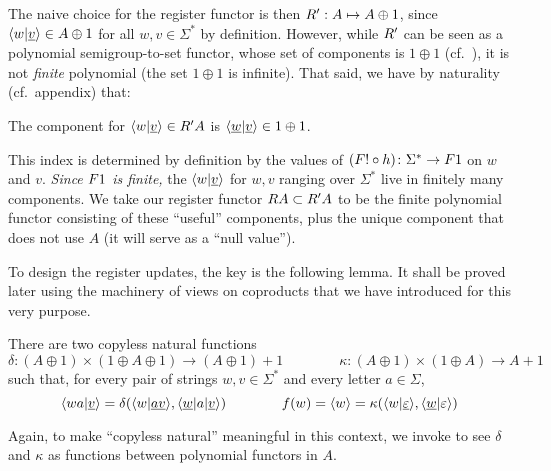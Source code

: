 The naive choice for the register functor is then $\functorr' : A \mapsto A
\oplus 1$, since $\langle w|\underline{v} \rangle \in A\oplus1$ for all $w,v\in\Sigma^*$
by definition. However, while $\functorr'$ can be seen as a polynomial
semigroup-to-set functor, whose set of components is $1 \oplus 1$ (cf.~), it is not \emph{finite} polynomial (the set $1\oplus1$ is infinite). That said, we have by naturality (cf.~appendix) that:
\begin{claim}\label{clm:component-index}
  The component for $\tuple{w|\underline{v}} \in \functorr'A$ is $\langle \underline{w}|\underline{v} \rangle \in 1 \oplus 1$.
\end{claim}
This index is determined by definition by the values of $(\functor! \circ h) \colon \Sigma^* \to \functor1$ on $w$ and $v$. \emph{Since $\functor1$ is finite,} the $\langle w|\underline{v} \rangle$ for $w,v$ ranging over $\Sigma^*$ live in finitely many components. We take our register functor  $\functorr A \subset \functorr' A$ to be the finite polynomial functor consisting of these \enquote{useful} components, plus the unique component that does not use $A$ (it will serve as a \enquote{null value}).

To design the register updates, the key is the following lemma. It shall be proved later using the machinery of views on coproducts that we have introduced for this very purpose.
\begin{lemma}\label{lem:compute-next-configuration}
  There are two {copyless} natural functions
  \[
    \delta\colon (A \oplus 1) \times (1 \oplus A \oplus 1) \to (A \oplus 1) + 1
    \qquad\qquad
    \kappa\colon (A \oplus 1) \times (1 \oplus A) \to A + 1
  \]
  such that, for every pair of strings $w,v \in \Sigma^*$ and every letter $a
  \in \Sigma$,
  \[ \langle wa|\underline v \rangle = \delta(\langle w|\underline
      {av} \rangle,\langle \underline w | a|\underline v \rangle) \qquad\qquad f(w) = \langle w \rangle =
    \kappa(\langle w|\underline\varepsilon \rangle,\langle \underline w | \varepsilon \rangle) \]
\end{lemma}
Again, to make \enquote{copyless natural} meaningful in this context, we invoke
 to see $\delta$ and $\kappa$ as
functions between polynomial functors in $A$.

